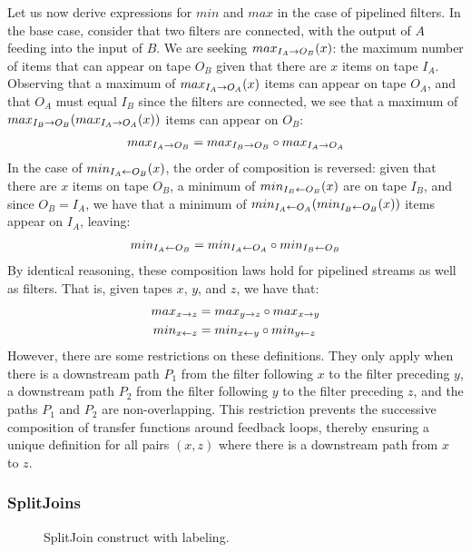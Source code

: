 Let us now derive expressions for $min$ and $max$ in the case of
pipelined filters.  In the base case, consider that two filters are
connected, with the output of $A$ feeding into the input of $B$.  We
are seeking $max_{I_A \rightarrow O_B}(x)$: the maximum number of items that can
appear on tape $O_B$ given that there are $x$ items on tape $I_A$.
Observing that a maximum of $max_{I_A \rightarrow O_A}(x)$ items can appear on
tape $O_A$, and that $O_A$ must equal $I_B$ since the filters are
connected, we see that a maximum of $max_{I_B \rightarrow O_B}(max_{I_A \rightarrow O_A}(x))$
items can appear on $O_B$:
\begin{align*}
max_{I_A \rightarrow O_B} = max_{I_B \rightarrow O_B} \circ max_{I_A \rightarrow O_A}
\end{align*}
In the case of $min_{I_A \leftarrow O_B}(x)$, the order of composition is
reversed: given that there are $x$ items on tape $O_B$, a minimum of
$min_{I_B \leftarrow O_B}(x)$ are on tape $I_B$, and since $O_B = I_A$, we have
that a minimum of $min_{I_A \leftarrow O_A}(min_{I_B \leftarrow O_B}(x))$ items appear on
$I_A$, leaving:
\begin{align*}
min_{I_A \leftarrow O_B} = min_{I_A \leftarrow O_A} \circ min_{I_B \leftarrow O_B}
\end{align*}
By identical reasoning, these composition laws hold for pipelined
streams as well as filters.  That is, given tapes $x$, $y$, and $z$, 
we have that:
\begin{align}
\label{eq:compose}
\begin{split}
max_{x \rightarrow z} &= max_{y \rightarrow z} \circ max_{x \rightarrow y} \\
min_{x \leftarrow z} &= min_{x \leftarrow y} \circ min_{y \leftarrow z}
\end{split}
\end{align}
However, there are some restrictions on these definitions.  They only
apply when there is a downstream path $P_1$ from the filter following
$x$ to the filter preceding $y$, a downstream path $P_2$ from the
filter following $y$ to the filter preceding $z$, and the paths $P_1$
and $P_2$ are non-overlapping.  This restriction prevents the
successive composition of transfer functions around feedback loops,
thereby ensuring a unique definition for all pairs $(x, z)$ where
there is a downstream path from $x$ to $z$.

\subsubsection{SplitJoins}

\begin{figure}
\centering
{}
\caption{\protect\small SplitJoin construct with labeling.
\protect\label{splitjoin}}
\end{figure}

